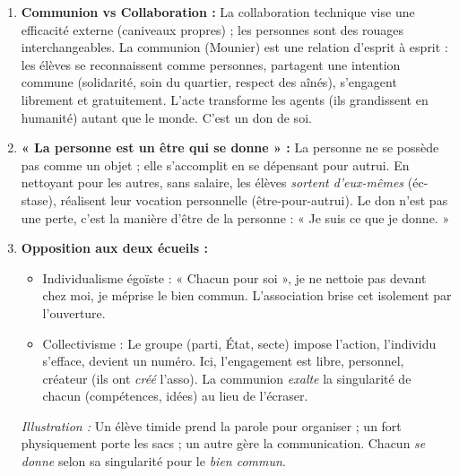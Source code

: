 \documentclass[11pt]{article}
\newcommand{\cle}[1]{{\popxbold\color{popdark}#1}}
\newcounter{popsec}
\newcounter{popsub}
\newcommand{\courssub}[1]{%
  \stepcounter{popsub}%
  \par\vspace{9pt}\noindent{\popxbold\fontsize{11.5}{13}\selectfont\color{popink}{\color{poporange}\thepopsec.\thepopsub}\hspace{6pt}#1}\par\nopagebreak\vspace{4pt}
}
\begin{document}
\begin{corrige}
\begin{enumerate}
    \item \textbf{Communion vs Collaboration :} La \cle{collaboration} technique vise une \cle{efficacité} externe (caniveaux propres) ; les personnes sont des \cle{rouages} interchangeables. La \cle{communion} (Mounier) est une \cle{relation d'esprit à esprit} : les élèves se \cle{reconnaissent} comme personnes, partagent une \cle{intention commune} (solidarité, soin du quartier, respect des aînés), s'engagent \cle{librement} et \cle{gratuitement}. L'acte transforme les agents (ils grandissent en humanité) autant que le monde. C'est un \cle{don de soi}.
    \item \textbf{« La personne est un être qui se donne » :} La personne ne se possède pas comme un objet ; elle \cle{s'accomplit} en \cle{se dépensant} pour autrui. En nettoyant pour les autres, sans salaire, les élèves \emph{sortent d'eux-mêmes} (éc-stase), réalisent leur \cle{vocation personnelle} (être-pour-autrui). Le don n'est pas une perte, c'est la \cle{manière d'être} de la personne : « Je suis ce que je donne. »
    \item \textbf{Opposition aux deux écueils :}
    \begin{itemize}
        \item \cle{Individualisme égoïste :} « Chacun pour soi », je ne nettoie pas devant chez moi, je méprise le bien commun. L'association brise cet isolement par l'\cle{ouverture}.
        \item \cle{Collectivisme :} Le groupe (parti, État, secte) impose l'action, l'individu s'efface, devient un numéro. Ici, l'engagement est \cle{libre}, \cle{personnel}, \cle{créateur} (ils ont \emph{créé} l'asso). La communion \emph{exalte} la singularité de chacun (compétences, idées) au lieu de l'écraser.
    \end{itemize}
    \textit{Illustration :} Un élève timide prend la parole pour organiser ; un fort physiquement porte les sacs ; un autre gère la communication. Chacun \emph{se donne} selon sa singularité pour le \emph{bien commun}.
\end{enumerate}
\end{corrige}

\courssub{Je me prépare au Bac}
\end{document}
